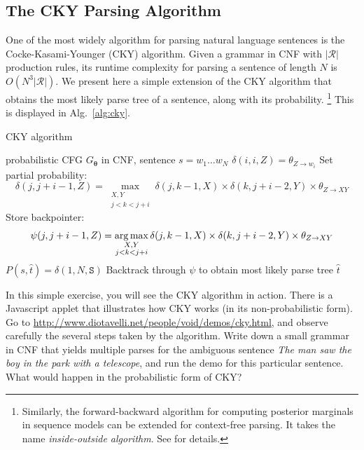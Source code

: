 \subsection{The CKY Parsing Algorithm}



One of the most widely algorithm for parsing natural language sentences is the 
Cocke-Kasami-Younger (CKY) algorithm. 
Given a grammar in CNF with $|\mathcal{R}|$ production rules, its runtime complexity for parsing a sentence of length $N$ 
is $O(N^3 |\mathcal{R}| )$. 
We present here a simple extension of the CKY algorithm 
that obtains the most likely parse tree of a sentence, along with its probability.%
\footnote{Similarly, the forward-backward algorithm for computing posterior marginals in sequence models can be extended for 
context-free parsing. It takes the name \emph{inside-outside algorithm}. See \citet{Manning1999} for details.} %
This is displayed in Alg.~\ref{alg:cky}. 


\begin{algorithm}[t]
   \caption{CKY algorithm \label{alg:cky}}
\begin{algorithmic}[1]
    probabilistic CFG ${G}_{\boldsymbol{\theta}}$ in CNF, sentence $s=w_1\ldots w_N$
	\STATE   
   \STATE {}
	\STATE $\delta(i,i,Z) = \theta_{Z \rightarrow w_i}$
	\ENDFOR
	\ENDFOR
	\STATE
	\STATE {}
	\STATE Set partial probability: 
	$$\delta(j,j+i-1,Z) = \max_{\substack{X,Y\\j<k<j+i}}  \delta(j,k-1,X) \times \delta(k,j+i-2,Y) \times \theta_{Z \rightarrow X Y}$$
	\STATE Store backpointer: 
	$$\psi(j,j+i-1,Z) = \operatorname*{arg\,max}_{\substack{X,Y\\j<k<j+i}}  \delta(j,k-1,X) \times \delta(k,j+i-2,Y) \times \theta_{Z \rightarrow X Y}$$
	\ENDFOR
	\ENDFOR
	\ENDFOR
	\STATE
	\STATE {}
	\STATE $P(s,{\hat t}) = \delta(1,N,\texttt{S})$
	\STATE Backtrack through $\psi$ to obtain most likely parse tree ${\hat t}$
\end{algorithmic}
\end{algorithm}

\begin{exercise}\label{exer:cky}
In this simple exercise, you will see the CKY algorithm in action. There is a Javascript applet that 
illustrates how CKY works (in its non-probabilistic form). 
Go to \url{http://www.diotavelli.net/people/void/demos/cky.html}, and 
observe carefully the several steps taken by the algorithm. 
Write down a small grammar in CNF that yields multiple parses for 
the ambiguous sentence \emph{The man saw the boy in the park with a telescope}, 
and run the demo for this particular sentence. What would happen in the probabilistic form of CKY? 

\end{exercise}

